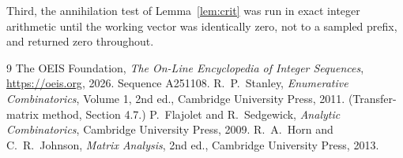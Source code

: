 \documentclass[11pt,a4paper]{article}
\theoremstyle{plain}
\theoremstyle{definition}
\begin{document}
Third, the annihilation test of Lemma~\ref{lem:crit} was run in exact integer arithmetic
until the working vector was identically zero, not to a sampled prefix, and returned zero
throughout.

\begin{thebibliography}{9}
 The OEIS Foundation, \emph{The On-Line Encyclopedia of Integer
Sequences}, \url{https://oeis.org}, 2026. Sequence A251108.
 R.~P.~Stanley, \emph{Enumerative Combinatorics}, Volume 1, 2nd ed.,
Cambridge University Press, 2011. (Transfer-matrix method, Section 4.7.)
 P.~Flajolet and R.~Sedgewick, \emph{Analytic Combinatorics}, Cambridge
University Press, 2009.
 R.~A.~Horn and C.~R.~Johnson, \emph{Matrix Analysis}, 2nd ed., Cambridge
University Press, 2013.
\end{thebibliography}
\end{document}
